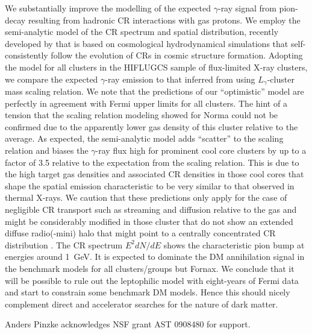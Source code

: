 \documentclass[10pt,aps,pra,reprint,amsmath,amsfonts,amssymb,showpacs]{revtex4-1}
\begin{document}
We substantially improve the modelling of the expected $\gamma$-ray signal from
pion-decay resulting from hadronic CR interactions with gas protons. We employ
the semi-analytic model of the CR spectrum and spatial distribution, recently
developed by \citet{2010MNRAS.409..449P} that is based on cosmological
hydrodynamical simulations that self-consistently follow the evolution of CRs in
cosmic structure formation. Adopting the model for all clusters in the HIFLUGCS
sample of flux-limited X-ray clusters, we compare the expected $\gamma$-ray
emission to that inferred from using $L_\gamma$-cluster mass scaling
relation. We note that the predictions of our ``optimistic'' model are perfectly
in agreement with Fermi upper limits for all clusters.  The hint of a tension
that the scaling relation modeling showed for Norma \citep{2010ApJ...717L..71A}
could not be confirmed due to the apparently lower gas density of this cluster
relative to the average.  As expected, the semi-analytic model adds ``scatter''
to the scaling relation and biases the $\gamma$-ray flux high for prominent cool
core clusters by up to a factor of 3.5 relative to the expectation from the
scaling relation. This is due to the high target gas densities and associated CR
densities in those cool cores that shape the spatial emission characteristic to
be very similar to that observed in thermal X-rays. We caution that these
predictions only apply for the case of negligible CR transport such as streaming
and diffusion relative to the gas and might be considerably modified in those
cluster that do not show an extended diffuse radio(-mini) halo that might point
to a centrally concentrated CR distribution \citep{2011A&A...527A..99E}. The CR
spectrum $E^2 dN/dE$ shows the characteristic pion bump at energies around
1~GeV. It is expected to dominate the DM annihilation signal in the benchmark
models for all clusters/groups but Fornax. We conclude that it will be possible
to rule out the leptophilic model with eight-years of Fermi data and start to
constrain some benchmark DM models. Hence this should nicely complement direct
and accelerator searches for the nature of dark matter.






\smallskip
Anders Pinzke acknowledges NSF grant AST 0908480 for support.


%
\end{document}

